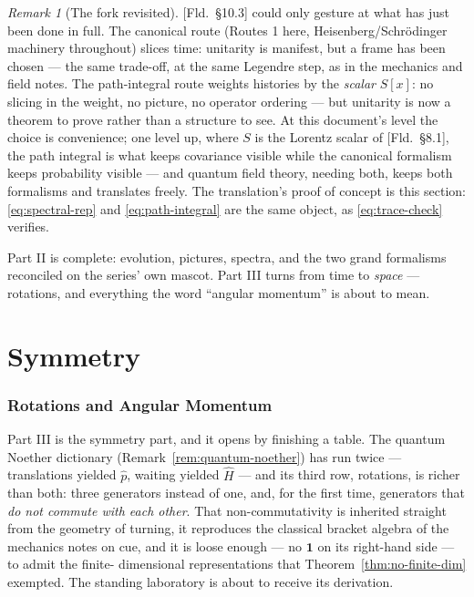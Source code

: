 \documentclass[11pt]{article}
\theoremstyle{plain}
\theoremstyle{definition}
\theoremstyle{remark}
\newtheorem{remark}[theorem]{Remark}
\newcommand{\op}[1]{\hat{#1}}
\newcommand{\idop}{\mathbf{1}}  %
\begin{document}
\begin{remark}[The fork revisited]
\label{rem:fork-revisited}
[Fld.\ \S10.3] could only gesture at what has just been done in
full. The canonical route (Routes 1 here, Heisenberg/Schr\"odinger
machinery throughout) slices time: unitarity is manifest, but a
frame has been chosen --- the same trade-off, at the same Legendre
step, as in the mechanics and field notes. The path-integral route weights
histories by the \emph{scalar} $S[x]$: no slicing in the weight, no
picture, no operator ordering --- but unitarity is now a theorem to
prove rather than a structure to see. At this document's level the
choice is convenience; one level up, where $S$ is the Lorentz
scalar of [Fld.\ \S8.1], the path integral is what keeps covariance
visible while the canonical formalism keeps probability visible ---
and quantum field theory, needing both, keeps both formalisms and
translates freely. The translation's proof of concept is this
section: \eqref{eq:spectral-rep} and \eqref{eq:path-integral} are
the same object, as \eqref{eq:trace-check} verifies.
\end{remark}

\medskip
\noindent
Part II is complete: evolution, pictures, spectra, and the two
grand formalisms reconciled on the series' own mascot. Part III
turns from time to \emph{space} --- rotations, and everything the
word ``angular momentum'' is about to mean.


\clearpage
\part{Symmetry}

\section{Rotations and Angular Momentum}
\label{sec:rotations}

Part III is the symmetry part, and it opens by finishing a table.
The quantum Noether dictionary
(Remark~\ref{rem:quantum-noether}) has run twice --- translations
yielded $\op p$, waiting yielded $\op H$ --- and its third row,
rotations, is richer than both: three generators instead of one,
and, for the first time, generators that \emph{do not commute with
each other}. That non-commutativity is inherited straight from the
geometry of turning, it reproduces the classical bracket algebra of
the mechanics notes on cue, and it is loose enough ---
no $\idop$ on its right-hand side --- to admit the finite-%
dimensional representations that Theorem~\ref{thm:no-finite-dim}
exempted. The standing laboratory is about to receive its
derivation.
\end{document}
